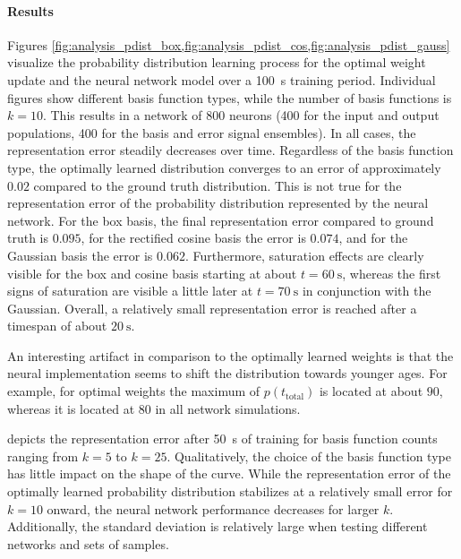 \documentclass[a4paper,11pt]{article}
\begin{document}
\paragraph{Results}
Figures \cref{fig:analysis_pdist_box,fig:analysis_pdist_cos,fig:analysis_pdist_gauss} visualize the probability distribution learning process for the optimal weight update and the neural network model over a \SI{100}{\second} training period. Individual figures show different basis function types, while the number of basis functions is $k = 10$. This results in a network of $800$ neurons (400 for the input and output populations, 400 for the basis and error signal ensembles). In all cases, the representation error steadily decreases over time. Regardless of the basis function type, the optimally learned distribution converges to an error of approximately $0.02$ compared to the ground truth distribution. This is not true for the representation error of the probability distribution represented by the neural network. For the box basis, the final representation error compared to ground truth is $0.095$, for the rectified cosine basis the error is $0.074$, and for the Gaussian basis the error is  $0.062$. Furthermore, saturation effects are clearly visible for the box and cosine basis starting at about $t = \SI{60}{\second}$, whereas the first signs of saturation are visible a little later at $t = \SI{70}{\second}$ in conjunction with the Gaussian. Overall, a relatively small representation error is reached after a timespan of about $\SI{20}{\second}$.

An interesting artifact in comparison to the optimally learned weights is that the neural implementation seems to shift the distribution towards younger ages. For example, for optimal weights the maximum of $p(t_\mathrm{total})$ is located at about $90$, whereas it is located at $80$ in all network simulations.

 depicts the representation error after \SI{50}{\second} of training for basis function counts ranging from $k = 5$ to $k = 25$. Qualitatively, the choice of the basis function type has little impact on the shape of the curve. While the representation error of the optimally learned probability distribution stabilizes at a relatively small error for $k = 10$ onward, the neural network performance decreases for larger $k$. Additionally, the standard deviation is relatively large when testing different networks and sets of samples.
\end{document}
